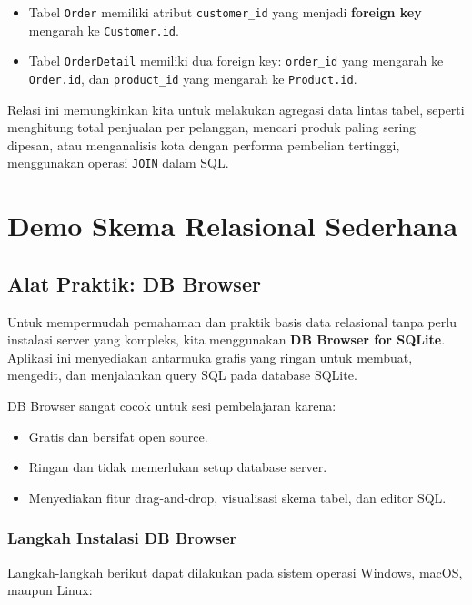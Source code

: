 \begin{itemize}
	\item Tabel \texttt{Order} memiliki atribut \texttt{customer\_id} yang menjadi \textbf{foreign key} mengarah ke \texttt{Customer.id}.
	\item Tabel \texttt{OrderDetail} memiliki dua foreign key: \texttt{order\_id} yang mengarah ke \texttt{Order.id}, dan \texttt{product\_id} yang mengarah ke \texttt{Product.id}.
\end{itemize}

Relasi ini memungkinkan kita untuk melakukan agregasi data lintas tabel, seperti menghitung total penjualan per pelanggan, mencari produk paling sering dipesan, atau menganalisis kota dengan performa pembelian tertinggi, menggunakan operasi \texttt{JOIN} dalam SQL.



\section{Demo Skema Relasional Sederhana}
\subsection{Alat Praktik: DB Browser}

Untuk mempermudah pemahaman dan praktik basis data relasional tanpa perlu instalasi server yang kompleks, kita menggunakan \textbf{DB Browser for SQLite}. Aplikasi ini menyediakan antarmuka grafis yang ringan untuk membuat, mengedit, dan menjalankan query SQL pada database SQLite.

DB Browser sangat cocok untuk sesi pembelajaran karena:
\begin{itemize}
	\item Gratis dan bersifat open source.
	\item Ringan dan tidak memerlukan setup database server.
	\item Menyediakan fitur drag-and-drop, visualisasi skema tabel, dan editor SQL.
\end{itemize}

\subsubsection{Langkah Instalasi DB Browser}

Langkah-langkah berikut dapat dilakukan pada sistem operasi Windows, macOS, maupun Linux:

